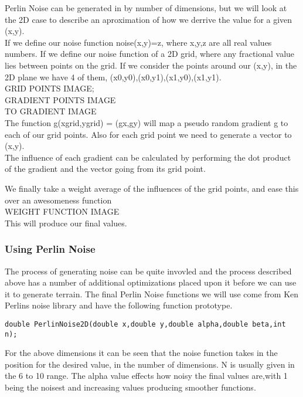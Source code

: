 Perlin Noise can be generated in by number of dimensions, but we will look at the
2D case to describe an aproximation of how we derrive the value for a given 
(x,y).\\

If we define our noise function noise(x,y)=z, where x,y,z are all real values
numbers. If we define our noise function of a 2D grid, where any fractional value
lies between points on the grid. If we consider the points around our (x,y), in
the 2D plane we have 4 of them, (x0,y0),(x0,y1),(x1,y0),(x1,y1).\\

GRID POINTS IMAGE;\\
GRADIENT POINTS IMAGE\\
TO GRADIENT IMAGE\\

The function g(xgrid,ygrid) = (gx,gy) will map a pseudo random gradient g to each
of our grid points. Also for each grid point we need to generate a vector to 
(x,y).\\

The influence of each gradient can be calculated by performing the dot product of
the gradient and the vector going from its grid point.

We finally take a weight average of the influences of the grid points, and ease
this over an awesomeness function\\

WEIGHT FUNCTION IMAGE\\

This will produce our final values.\\

\subsubsection*{Using Perlin Noise}
The process of generating noise can be quite invovled and the process described
above has a number of additional optimizations placed upon it before we can use
it to generate terrain. The final Perlin Noise functions we will use come from
Ken Perlins noise library and have the following function prototype.\\

\begin{lstlisting}
double PerlinNoise2D(double x,double y,double alpha,double beta,int n);
\end{lstlisting}

For the above dimensions it can be seen that the noise function takes in the 
position for the desired value, in the number of dimensions. N is usually given
in the 6 to 10 range. The alpha value effects how noisy the final values are,with
1 being the noisest and increasing values producing smoother functions.\\

